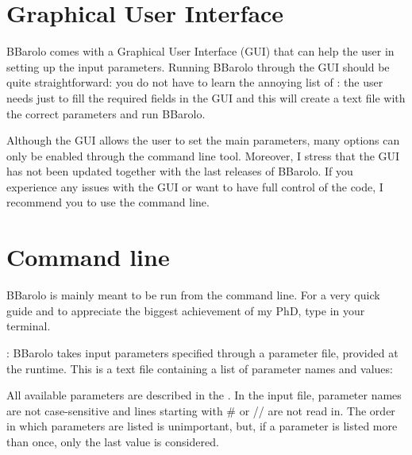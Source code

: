 \documentclass[letterpaper,10pt,english]{sphinxmanual}
\begin{document}
\section{Graphical User Interface}
\label{\detokenize{running:graphical-user-interface}}
BBarolo comes with a Graphical User Interface (GUI) that can help the user in setting up the input parameters.
Running BBarolo through the GUI should be quite straightforward: you do not have to learn the annoying list of {\hyperref[\detokenize{tasks:alltasks}]{}}: the user needs just to fill the required fields in the GUI and this will create a text file with the correct parameters and run BBarolo.

 Although the GUI allows the user to set the main parameters, many options can only be enabled through the command line tool. Moreover, I stress that the GUI has not been updated together with the last releases of BBarolo. If you experience any issues with the GUI or want to have full control of the code, I recommend you to use the command line.


\section{Command line}
\label{\detokenize{running:command-line}}
BBarolo is mainly meant to be run from the command line. For a very quick guide and to appreciate the biggest achievement of my PhD, type  in your terminal.

: BBarolo takes input parameters specified through a parameter file, provided at the runtime. This is a text file containing a list of parameter names and values:

\begin{sphinxVerbatim}[commandchars=\\\{\}]
     
     
     
        
\end{sphinxVerbatim}

All available parameters are described in the {\hyperref[\detokenize{tasks:alltasks}]{}}. In the input file, parameter names are not case-sensitive and lines starting with \# or // are not read in. The order in which parameters are listed is unimportant, but, if a parameter is listed more than once, only the last value is considered.
\end{document}
